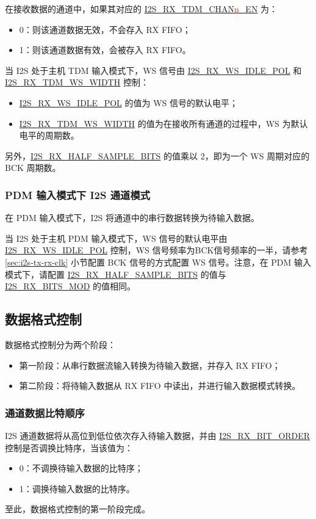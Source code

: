 \documentclass[main\_\_CN.tex]{subfiles}
\begin{document}
在接收数据的通道中，如果其对应的 \hyperref[fielddesc:I2STXTDMCHAN0EN]{I2S\_RX\_TDM\_CHAN{\textcolor{red}{n}}\_EN} 为：
\begin{itemize}
    \item 0：则该通道数据无效，不会存入 RX FIFO；
    \item 1：则该通道数据有效，会被存入 RX FIFO。
\end{itemize}
当 I2S 处于主机 TDM 输入模式下，WS 信号由 \hyperref[fielddesc:I2SRXWSIDLEPOL]{I2S\_RX\_WS\_IDLE\_POL} 和 \hyperref[fielddesc:I2SRXTDMWSWIDTH]{I2S\_RX\_TDM\_WS\_WIDTH} 控制：
\begin{itemize}
    \item \hyperref[fielddesc:I2SRXWSIDLEPOL]{I2S\_RX\_WS\_IDLE\_POL} 的值为 WS 信号的默认电平；
    \item \hyperref[fielddesc:I2SRXTDMWSWIDTH]{I2S\_RX\_TDM\_WS\_WIDTH} 的值为在接收所有通道的过程中，WS 为默认电平的周期数。
\end{itemize}
另外，\hyperref[fielddesc:I2SRXHALFSAMPLEBITS]{I2S\_RX\_HALF\_SAMPLE\_BITS} 的值乘以 2，即为一个 WS 周期对应的 BCK 周期数。

\subsubsection{PDM 输入模式下 I2S 通道模式} 
在 PDM 输入模式下，I2S 将通道中的串行数据转换为待输入数据。

当 I2S 处于主机 PDM 输入模式下，WS 信号的默认电平由 \hyperref[fielddesc:I2SRXWSIDLEPOL]{I2S\_RX\_WS\_IDLE\_POL} 控制，WS 信号频率为BCK信号频率的一半，请参考 \ref{sec:i2s-tx-rx-clk} 小节配置 BCK 信号的方式配置 WS 信号。注意，在 PDM 输入模式下，请配置 \hyperref[fielddesc:I2SRXHALFSAMPLEBITS]{I2S\_RX\_HALF\_SAMPLE\_BITS} 的值与 \hyperref[fielddesc:I2SRXBITSMOD]{I2S\_RX\_BITS\_MOD} 的值相同。

\subsection{数据格式控制}
数据格式控制分为两个阶段：
\begin{itemize}
    \item 第一阶段：从串行数据流输入转换为待输入数据，并存入 RX FIFO；
    \item 第二阶段：将待输入数据从 RX FIFO 中读出，并进行输入数据模式转换。
\end{itemize}

\subsubsection{通道数据比特顺序} 
\chipname{} I2S 通道数据将从高位到低位依次存入待输入数据，并由 \hyperref[fielddesc:I2SRXBITORDER]{I2S\_RX\_BIT\_ORDER} 控制是否调换比特序，当该值为：
\begin{itemize}
\item 0：不调换待输入数据的比特序；
\item 1：调换待输入数据的比特序。
\end{itemize}
至此，数据格式控制的第一阶段完成。
\end{document}

